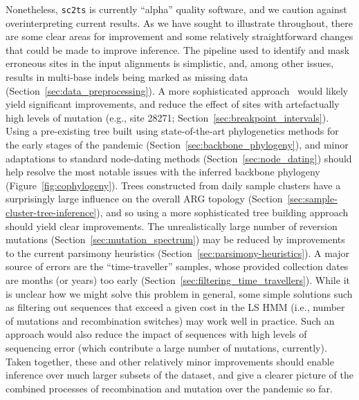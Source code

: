 \documentclass{article}
\begin{document}
Nonetheless, \texttt{sc2ts} is currently ``alpha'' quality software, and
we caution against overinterpreting current results. As we have sought
to illustrate throughout, there are some clear areas for improvement
and some relatively straightforward changes that could be made to
improve inference. The pipeline used to identify and
mask erroneous sites in the input alignments is simplistic, and, among
other issues, results in multi-base indels being marked as missing data
(Section~\ref{sec:data_preprocessing}). A more sophisticated
approach~\citep[e.g.][]{Aksamentov2021-hj} would
likely yield significant improvements, and reduce the effect of sites with
artefactually high levels of mutation (e.g., site 28271;
Section~\ref{sec:breakpoint_intervals}).
Using a pre-existing tree built using state-of-the-art phylogenetics methods
for the early stages of the pandemic (Section~\ref{sec:backbone_phylogeny}),
and minor adaptations to standard node-dating methods
(Section~\ref{sec:node_dating}) should help resolve the most notable issues with
the inferred backbone phylogeny (Figure~\ref{fig:cophylogeny}).
Trees constructed from daily sample clusters have a surprisingly large
influence on the overall ARG topology
(Section~\ref{sec:sample-cluster-tree-inference}), and so using a more
sophisticated tree building approach should yield clear improvements.
The unrealistically large number of reversion mutations
(Section~\ref{sec:mutation_spectrum}) may be reduced by
improvements to the current parsimony
heuristics (Section~\ref{sec:parsimony-heuristics}).
A major source of errors are the ``time-traveller'' samples, whose
provided collection dates are months (or years) too early
(Section~\ref{sec:filtering_time_travellers}).
While it is unclear how
we might solve this problem in general, some simple solutions such
as filtering out sequences that exceed a given cost in the LS HMM
(i.e., number of mutations and recombination switches) may work well
in practice. Such an approach would also reduce the impact of sequences
with high levels of sequencing error (which contribute a large number of
mutations, currently).
Taken together, these and other relatively minor improvements should
enable inference over much larger subsets of the dataset, and
give a clearer picture of the combined processes of recombination and
mutation over the pandemic so far.
\end{document}
